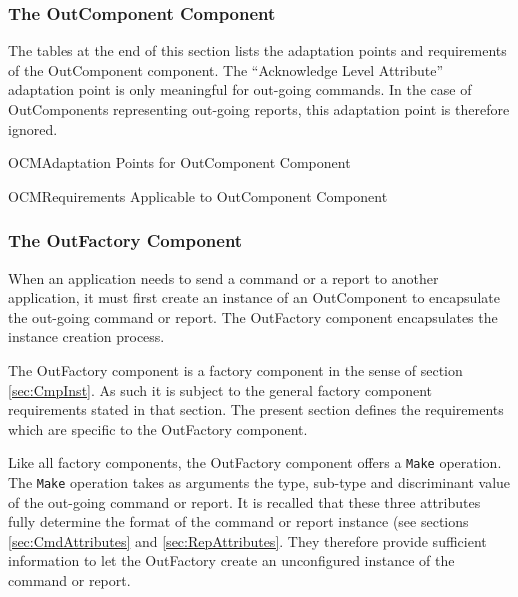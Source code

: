 \documentclass{pnp_article}
\begin{document}
\subsubsection{The OutComponent Component}\label{sec:OutComponent}
 

The tables at the end of this section lists the adaptation points and requirements of the OutComponent component. The “Acknowledge Level Attribute” adaptation point is only meaningful for out-going commands. In the case of OutComponents representing out-going reports, this adaptation point is therefore ignored.

\begin{crAp}{OCM}{Adaptation Points for OutComponent Component}
\end{crAp}

\begin{crReq}{OCM}{Requirements Applicable to OutComponent Component}
\end{crReq}

\subsubsection{The OutFactory Component}\label{sec:OutFactory}

When an application needs to send a command or a report to another application, it must first create an instance of an OutComponent to encapsulate the out-going command or report. The OutFactory component encapsulates the instance creation process.

The OutFactory component is a factory component in the sense of section \ref{sec:CmpInst}. As such it is subject to the general factory component requirements stated in that section. The present section defines the requirements which are specific to the OutFactory component.

Like all factory components, the OutFactory component offers a \texttt{Make} operation. The \texttt{Make} operation takes as arguments the type, sub-type and discriminant value of the out-going command or report. It is recalled that these three attributes fully determine the format of the command or report instance (see sections \ref{sec:CmdAttributes} and \ref{sec:RepAttributes}. They therefore provide sufficient information to let the OutFactory create an unconfigured instance of the command or report.
\end{document}
